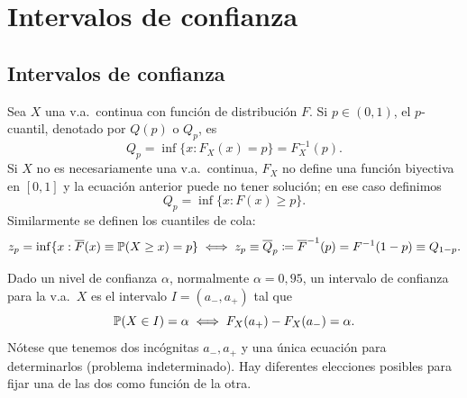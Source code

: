 \chapter{Intervalos de confianza}

\section{Intervalos de confianza}

\begin{definicion}
Sea $X$ una v.a.\ continua con función de distribución $F$. Si $p \in (0,1)$, el $p$-cuantil, denotado por $Q(p)$ o $Q_p$, es
\[
  Q_p = \inf\{x : F_X(x) = p\} = F_X^{-1}(p).
\]\textcolor{azulresalt}{
Si $X$ no es necesariamente una v.a.\ continua, $F_X$ no define una función biyectiva en $[0,1]$ y la ecuación anterior puede no tener solución; en ese caso definimos
\[
  Q_p = \inf\{x : F(x) \ge p\}.
\]
Similarmente se definen los cuantiles de cola:
\[
  z_p = \inf\{x : \overline{F}(x) \equiv \mathbb{P}(X \ge x) = p\} \iff z_p \equiv \overline{Q}_p \coloneqq \overline{F}^{-1}(p) = F^{-1}(1-p) \equiv Q_{1-p}.
\]}
\end{definicion}
\begin{definicion}
Dado un nivel de confianza $\alpha$, normalmente $\alpha = 0{,}95$, un intervalo de confianza para la v.a.\ $X$ es el intervalo $I = (a_-, a_+)$ tal que
\[
  \mathbb{P}(X \in I) = \alpha \iff F_X(a_+) - F_X(a_-) = \alpha.
\]
Nótese que tenemos dos incógnitas $a_-, a_+$ y una única ecuación para determinarlos (problema indeterminado). Hay diferentes elecciones posibles para fijar una de las dos como función de la otra.
\end{definicion}

